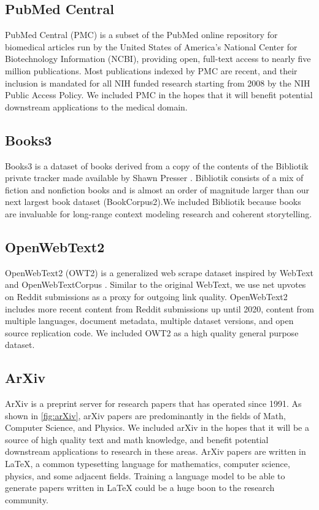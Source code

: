 \subsection{PubMed Central}\label{subsection:pmc}

PubMed Central (PMC) is a subset of the PubMed online repository for biomedical articles run by the United States of America's National Center for Biotechnology Information (NCBI), providing open, full-text access to nearly five million publications. Most publications indexed by PMC are recent, and their inclusion is mandated for all NIH funded research starting from 2008 by the NIH Public Access Policy. We included PMC in the hopes that it will benefit potential downstream applications to the medical domain.

\subsection{Books3}

Books3 is a dataset of books derived from a copy of the contents of the Bibliotik private tracker made available by Shawn Presser \citep{bibliotik}. Bibliotik consists of a mix of fiction and nonfiction books and is almost an order of magnitude larger than our next largest book dataset (BookCorpus2).We included Bibliotik because books are invaluable for long-range context modeling research and coherent storytelling.

\subsection{OpenWebText2}

OpenWebText2 (OWT2) is a generalized web scrape dataset inspired by WebText \citep{GPT2} and OpenWebTextCorpus \citep{OpenWeb}. Similar to the original WebText, we use net upvotes on Reddit submissions as a proxy for outgoing link quality. OpenWebText2 includes more recent content from Reddit submissions up until 2020, content from multiple languages, document metadata, multiple dataset versions, and open source replication code. We included OWT2 as a high quality general purpose dataset.

\subsection{ArXiv}

ArXiv is a preprint server for research papers that has operated since 1991. As shown in \ref{fig:arXiv}, arXiv papers are predominantly in the fields of Math, Computer Science, and Physics. We included arXiv in the hopes that it will be a source of high quality text and math knowledge, and benefit potential downstream applications to research in these areas. ArXiv papers are written in LaTeX, a common typesetting language for mathematics, computer science, physics, and some adjacent fields. Training a language model to be able to generate papers written in LaTeX could be a huge boon to the research community.

